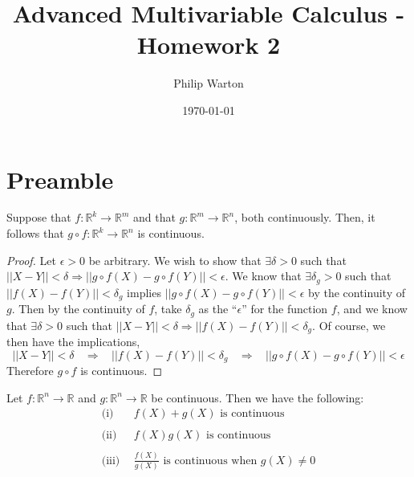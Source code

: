 \documentclass{article}
\theoremstyle{definition}
\begin{document}
\title{Advanced Multivariable Calculus - Homework 2}
\author{Philip Warton}
\date{\today}
\maketitle
\section*{Preamble}
    \begin{mdframed}
        Suppose that $f:\mathbb{R}^k \rightarrow \mathbb{R}^m$ and that $g:\mathbb{R}^m \rightarrow \mathbb{R}^n$, both continuously.
        Then, it follows that $g \circ f : \mathbb{R}^k \rightarrow \mathbb{R}^n$ is continuous.
    \end{mdframed}
    \begin{proof}
        Let $\epsilon > 0$ be arbitrary. We wish to show that $\exists \delta > 0$ such that $||X-Y||< \delta \Rightarrow ||g\circ f(X) - g\circ f(Y)||<\epsilon$.
        We know that $\exists \delta_g > 0$ such that $||f(X) - f(Y)||< \delta_g$ implies $||g\circ f(X) - g\circ f(Y)||< \epsilon$ by the continuity of $g$.
        Then by the continuity of $f$, take $\delta_g$ as the ``$\epsilon$'' for the function $f$, and we know that $\exists \delta > 0$ such that
        $||X - Y||<\delta \Rightarrow ||f(X) - f(Y)||<\delta_g$. Of course, we then have the implications,
        \[
            ||X - Y||<\delta \ \ \ \ \Longrightarrow \ \ \ \ ||f(X) - f(Y)||<\delta_g \ \ \ \ \Longrightarrow \ \ \ \ ||g\circ f(X) - g \circ f(Y)||<\epsilon
        \]
        Therefore $g\circ f$ is continuous.
    \end{proof}
    \begin{mdframed}
        Let $f : \mathbb{R}^n \rightarrow \mathbb{R}$ and $g: \mathbb{R}^n \rightarrow \mathbb{R}$ be continuous.
        Then we have the following:
        \begin{align*}
            \text{(i)} \ \ & f(X) + g(X) \text{ is continuous}\\\\
            \text{(ii)}\ \  & f(X)g(X) \text{ is continuous} \\\\
            \text{(iii)} \ \ & \frac{f(X)}{g(X)} \text{ is continuous when } g(X) \neq 0
        \end{align*}
    \end{mdframed}
\end{document}
